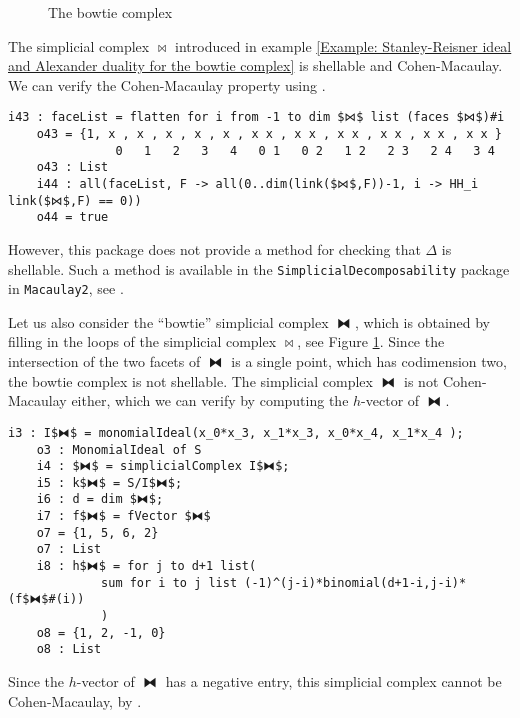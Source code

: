 \documentclass[12pt,leqno]{amsart}
\theoremstyle{definition}
\newenvironment{example}
{\pushQED{\qed}\renewcommand{\qedsymbol}{$\diamond$}\examplex}
{\popQED\endexamplex}
\begin{document}
%
\begin{figure}[t]
  \caption{The bowtie complex}\label{Figure: the bowtie complex}
\end{figure}
%
\begin{example}\label{Example: Shellability, the Cohen-Macaulay property, and the h-vector}
  The simplicial complex $\bowtie$ introduced in example \ref{Example: Stanley-Reisner ideal and Alexander duality for the bowtie complex} is shellable and Cohen-Macaulay. We can verify the Cohen-Macaulay property using \cite[Corollary 5.3.9]{BH}.
\begin{lstlisting}[basicstyle={\ttfamily \scriptsize}, xleftmargin=-23pt]
    i43 : faceList = flatten for i from -1 to dim $⋈$ list (faces $⋈$)#i
    o43 = {1, x , x , x , x , x , x x , x x , x x , x x , x x , x x }
               0   1   2   3   4   0 1   0 2   1 2   2 3   2 4   3 4
    o43 : List
    i44 : all(faceList, F -> all(0..dim(link($⋈$,F))-1, i -> HH_i link($⋈$,F) == 0))
    o44 = true
\end{lstlisting}
  However, this package does not provide a method for checking that $\Delta$ is shellable. Such a method is available in the \texttt{SimplicialDecomposability} package in \texttt{Macaulay2}, see \cite{Cook}.

  Let us also consider the ``bowtie'' simplicial complex $\fbowtie$, which is obtained by filling in the loops of the simplicial complex $\bowtie$, see Figure \ref{Figure: the bowtie complex}. Since the intersection of the two facets of $\fbowtie$ is a single point, which has codimension two, the bowtie complex is not shellable. The simplicial complex $\fbowtie$ is not Cohen-Macaulay either, which we can verify by computing the $h$-vector of $\fbowtie$.
\begin{lstlisting}[basicstyle={\ttfamily \scriptsize}, xleftmargin=-23pt]
    i3 : I$⧓$ = monomialIdeal(x_0*x_3, x_1*x_3, x_0*x_4, x_1*x_4 );
    o3 : MonomialIdeal of S
    i4 : $⧓$ = simplicialComplex I$⧓$;
    i5 : k$⧓$ = S/I$⧓$;
    i6 : d = dim $⧓$;
    i7 : f$⧓$ = fVector $⧓$
    o7 = {1, 5, 6, 2}
    o7 : List
    i8 : h$⧓$ = for j to d+1 list(
             sum for i to j list (-1)^(j-i)*binomial(d+1-i,j-i)*(f$⧓$#(i))
             )
    o8 = {1, 2, -1, 0}
    o8 : List
\end{lstlisting}
  Since the $h$-vector of $\fbowtie$ has a negative entry, this simplicial complex cannot be Cohen-Macaulay, by \cite[Lemma 5.1.10]{BH}.
\end{example}
\end{document}
